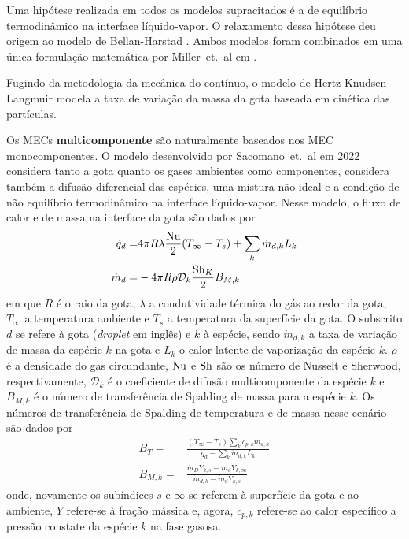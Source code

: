 Uma hipótese realizada em todos os modelos supracitados é a de equilíbrio termodinâmico na interface líquido-vapor.
O relaxamento dessa hipótese deu origem ao modelo de Bellan-Harstad \cite{BellanJ1987}.
Ambos modelos foram combinados em uma única formulação matemática por Miller~et.~al em \cite{MillerR1998}.

Fugindo da metodologia da mecânica do contínuo, o modelo de Hertz-Knudsen-Langmuir  modela a taxa de variação da massa da gota baseada em cinética das partículas.

Os MECs \textbf{multicomponente} são naturalmente baseados nos MEC monocomponentes.
O modelo desenvolvido por Sacomano~et.~al em 2022 \cite{SacomanoF2022IJHMT} considera tanto a gota quanto os gases ambientes como componentes, considera também a difusão diferencial das espécies, uma mistura não ideal e a condição de não equilíbrio termodinâmico na interface líquido-vapor.
Nesse modelo, o fluxo de calor e de massa na interface da gota são dados por 
\begin{align}
    \dot q_d =& 4\pi R \lambda \frac{\mathrm{Nu}}{2}(T_\infty - T_s) + \sum_k \dot m_{d,k} L_k \label{eq:dmd} \\
    \dot m_d =& -4 \pi R \rho \mathcal D_k \frac{\mathrm{Sh}_K}{2}B_{M,k} \label{eq:dqd}
\end{align}
em que $R$ é o raio da gota, $\lambda$ a condutividade térmica do gás ao redor da gota, $T_\infty$ a temperatura ambiente e $T_s$ a temperatura da superfície da gota. 
O subscrito $d$ se refere à gota (\emph{droplet} em inglês) e $k$ à espécie, sendo $\dot m_{d,k}$ a taxa de variação de massa da espécie $k$ na gota e $L_k$ o calor latente de vaporização da espécie $k$.
$\rho$ é a densidade do gas circundante, $\mathrm{Nu}$ e $\mathrm{Sh}$ são os número de Nusselt e Sherwood, respectivamente, $\mathcal D_k$ é o coeficiente de difusão multicomponente da espécie $k$ e $B_{M,k}$ é o número de transferência de Spalding de massa para a espécie $k$.
Os números de transferência de Spalding de temperatura e de massa nesse cenário são dados por
\begin{align}
    B_T =& \frac
        {(T_\infty - T_s) \sum_k c_{p,k}\dot m_{d,k}}
        {\dot q_d - \sum_k \dot m_{d,k} L_k} \label{eq:B_T}\\
    B_{M,k} =& \frac
        {\dot m_D Y_{k,s} - \dot m_d Y_{k,\infty}}
        {\dot m_{d,k} - \dot m_d Y_{k,s}}\label{eq:B_Mk}
\end{align}
onde, novamente os subíndices $s$ e $\infty$ se referem à superfície da gota e ao ambiente, $Y$ refere-se à fração mássica e, agora, $c_{p,k}$ refere-se ao calor específico a pressão constate da espécie $k$ na fase gasosa.
